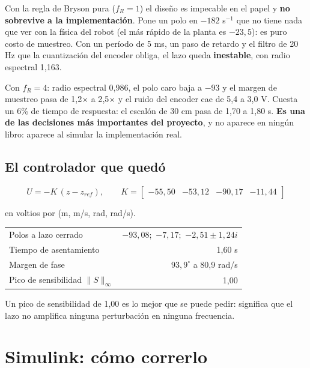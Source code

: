 \documentclass[11pt,a4paper]{report}
\begin{document}
\begin{ojo}
Con la regla de Bryson pura ($f_R = 1$) el diseño es impecable en el papel y
\textbf{no sobrevive a la implementación}. Pone un polo en $-182$ s$^{-1}$ que no tiene nada
que ver con la física del robot (el más rápido de la planta es $-23{,}5$): es puro costo de
muestreo. Con un período de 5 ms, un paso de retardo y el filtro de 20 Hz que la cuantización
del encoder obliga, el lazo queda \textbf{inestable}, con radio espectral 1{,}163.

Con $f_R = 4$: radio espectral 0{,}986, el polo caro baja a $-93$ y el margen de muestreo pasa
de 1{,}2$\times$ a 2{,}5$\times$ y el ruido del encoder cae de 5{,}4 a 3{,}0 V. Cuesta un 6\%
de tiempo de respuesta: el escalón de 30 cm pasa de 1{,}70 a 1{,}80 s. \textbf{Es una de las decisiones más importantes del proyecto}, y no aparece en
ningún libro: aparece al simular la implementación real.
\end{ojo}

\section{El controlador que quedó}

\begin{equation}
U = -K\,(z - z_{ref}), \qquad
K = \begin{bmatrix} -55{,}50 & -53{,}12 & -90{,}17 & -11{,}44 \end{bmatrix}
\end{equation}

en voltios por (m, m/s, rad, rad/s).

\begin{center}
\begin{tabular}{@{}lr@{}}
\toprule
Polos a lazo cerrado & $-93{,}08$;\ $-7{,}17$;\ $-2{,}51 \pm 1{,}24i$ \\
Tiempo de asentamiento & 1{,}60 s \\
Margen de fase & $93{,}9^\circ$ a 80{,}9 rad/s \\
Pico de sensibilidad $\|S\|_\infty$ & 1{,}00 \\
\bottomrule
\end{tabular}
\end{center}

Un pico de sensibilidad de 1{,}00 es lo mejor que se puede pedir: significa que el lazo no
amplifica ninguna perturbación en ninguna frecuencia.

\chapter{Simulink: cómo correrlo}\label{cap:simulink}
\end{document}

